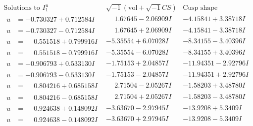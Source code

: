 \documentclass[1p]{elsarticle_modified}
\theoremstyle{definition}
\newcommand{\I}{\sqrt{-1}}
\begin{document}
$$\begin{array}{c|c|c}  
\text{Solutions to }I^u_{1}& \I (\text{vol} + \sqrt{-1}CS) & \text{Cusp shape}\\
 \hline 
\begin{aligned}
u &= -0.730327 + 0.712584 I\end{aligned}
 & \phantom{-}1.67645 - 2.06909 I & -4.15841 + 3.38718 I \\ \hline\begin{aligned}
u &= -0.730327 - 0.712584 I\end{aligned}
 & \phantom{-}1.67645 + 2.06909 I & -4.15841 - 3.38718 I \\ \hline\begin{aligned}
u &= \phantom{-}0.551518 + 0.799916 I\end{aligned}
 & -5.35554 + 6.07028 I & -8.34155 - 3.40396 I \\ \hline\begin{aligned}
u &= \phantom{-}0.551518 - 0.799916 I\end{aligned}
 & -5.35554 - 6.07028 I & -8.34155 + 3.40396 I \\ \hline\begin{aligned}
u &= -0.906793 + 0.533130 I\end{aligned}
 & -1.75153 + 2.04857 I & -11.94351 - 2.92796 I \\ \hline\begin{aligned}
u &= -0.906793 - 0.533130 I\end{aligned}
 & -1.75153 - 2.04857 I & -11.94351 + 2.92796 I \\ \hline\begin{aligned}
u &= \phantom{-}0.804216 + 0.685158 I\end{aligned}
 & \phantom{-}2.71504 - 2.05267 I & -1.58203 + 3.48780 I \\ \hline\begin{aligned}
u &= \phantom{-}0.804216 - 0.685158 I\end{aligned}
 & \phantom{-}2.71504 + 2.05267 I & -1.58203 - 3.48780 I \\ \hline\begin{aligned}
u &= \phantom{-}0.924638 + 0.148092 I\end{aligned}
 & -3.63670 - 2.97945 I & -13.9208 + 5.3409 I \\ \hline\begin{aligned}
u &= \phantom{-}0.924638 - 0.148092 I\end{aligned}
 & -3.63670 + 2.97945 I & -13.9208 - 5.3409 I \\ \hline\begin{aligned}

\end{aligned}
\end{array}$$
\end{document}
